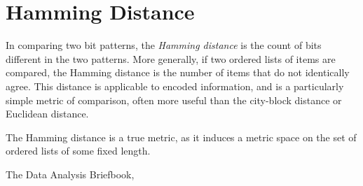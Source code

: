 \documentclass{article}
\begin{document}

\section{Hamming Distance}

In comparing two bit patterns, the \emph{Hamming distance} is the count of bits different in the two patterns. More generally, if two ordered lists of items are compared, the Hamming distance is the number of items that do not identically agree. This distance is applicable to encoded information, and is a particularly simple metric of comparison, often more useful than the city-block distance or Euclidean distance. 

The Hamming distance is a true metric, as it induces a metric space on the set of ordered lists of some fixed length.

\begin{thebibliography}{3}

 The Data Analysis Briefbook, 

\end{thebibliography}
\end{document}
